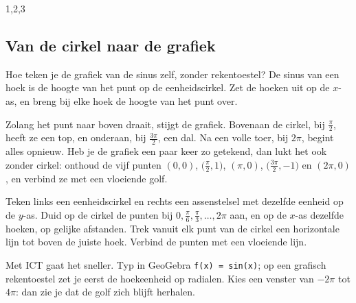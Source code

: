 \begin{alleenvoor}{1,2,3}
\subsection{Van de cirkel naar de grafiek}

Hoe teken je de grafiek van de sinus zelf, zonder rekentoestel? De sinus van een hoek is de hoogte van het punt op de eenheidscirkel. Zet de hoeken uit op de $x$-as, en breng bij elke hoek de hoogte van het punt over.


Zolang het punt naar boven draait, stijgt de grafiek. Bovenaan de cirkel, bij $\frac{\pi}{2}$, heeft ze een top, en onderaan, bij $\frac{3\pi}{2}$, een dal. Na een volle toer, bij $2\pi$, begint alles opnieuw. Heb je de grafiek een paar keer zo getekend, dan lukt het ook zonder cirkel: onthoud de vijf punten $(0, 0)$, $\bigl(\frac{\pi}{2}, 1\bigr)$, $(\pi, 0)$, $\bigl(\frac{3\pi}{2}, -1\bigr)$ en $(2\pi, 0)$, en verbind ze met een vloeiende golf.

\begin{werkwijze}
Teken links een eenheidscirkel en rechts een assenstelsel met dezelfde eenheid op de $y$-as. Duid op de cirkel de punten bij $0, \frac{\pi}{6}, \frac{\pi}{3}, \ldots, 2\pi$ aan, en op de $x$-as dezelfde hoeken, op gelijke afstanden. Trek vanuit elk punt van de cirkel een horizontale lijn tot boven de juiste hoek. Verbind de punten met een vloeiende lijn.
\end{werkwijze}

Met ICT gaat het sneller. Typ in GeoGebra \texttt{f(x) = sin(x)}; op een grafisch rekentoestel zet je eerst de hoekeenheid op radialen. Kies een venster van $-2\pi$ tot $4\pi$: dan zie je dat de golf zich blijft herhalen.

\begin{oefeningen}
\end{oefeningen}
\end{alleenvoor}
